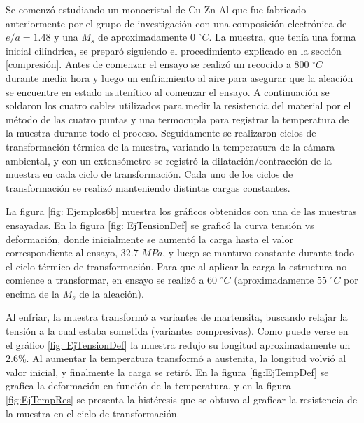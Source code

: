 \documentclass[a4paper,12pt,fleqn,twoside,openany]{book}
\begin{document}
Se comenzó estudiando un monocristal de Cu-Zn-Al que fue fabricado anteriormente por el grupo de investigación con una composición electrónica de $e/a=1.48$ y una $M_s$ de aproximadamente $0$ $^\circ C$. La muestra, que tenía una forma inicial cilíndrica, se preparó siguiendo el procedimiento explicado en la sección \ref{compresión}. Antes de comenzar el ensayo se realizó un recocido a $800$ $ ^\circ C$ durante media hora y luego un enfriamiento al aire para asegurar que la aleación se encuentre en estado asutenítico al comenzar el ensayo. A continuación se soldaron los cuatro cables utilizados para medir la resistencia del material por el método de las cuatro puntas y una termocupla para registrar la temperatura de la muestra durante todo el proceso. Seguidamente se realizaron ciclos de transformación térmica de la muestra, variando la temperatura de la cámara ambiental, y con un extensómetro se registró la dilatación/contracción de la muestra en cada ciclo de transformación. Cada uno de los ciclos de transformación se realizó manteniendo distintas cargas constantes. 

La figura \ref{fig: Ejemplos6b} muestra los gráficos obtenidos con una de las muestras ensayadas. En la figura \ref{fig: EjTensionDef} se graficó la curva tensión vs deformación, donde inicialmente se aumentó la carga hasta el valor correspondiente al ensayo, $32.7$ $MPa$, y luego se mantuvo constante durante todo el ciclo térmico de transformación. Para que al aplicar la carga la estructura no comience a transformar, en ensayo se realizó a $60$ $^\circ C$ (aproximadamente $55$ $^\circ C$ por encima de la $M_s$ de la aleación).  


Al enfriar, la muestra transformó a variantes de martensita, buscando relajar la tensión a la cual estaba sometida (variantes compresivas). Como puede verse en el gráfico \ref{fig: EjTensionDef} la muestra redujo su longitud aproximadamente un $2.6\%$. Al aumentar la temperatura transformó a austenita, la longitud volvió al valor inicial, y finalmente la carga se retiró. En la figura \ref{fig:EjTempDef} se grafica la deformación en función de la temperatura, y en la figura \ref{fig:EjTempRes} se presenta la histéresis que se obtuvo al graficar la resistencia de la muestra en el ciclo de transformación. 

\end{document}

